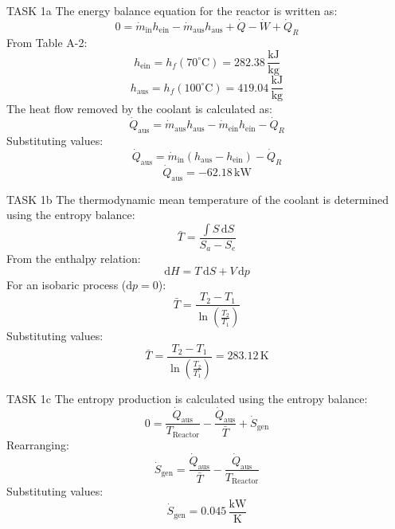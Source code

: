 TASK 1a  
The energy balance equation for the reactor is written as:  
\[
0 = \dot{m}_{\text{in}} h_{\text{ein}} - \dot{m}_{\text{aus}} h_{\text{aus}} + \dot{Q} - \dot{W} + \dot{Q}_R
\]  
From Table A-2:  
\[
h_{\text{ein}} = h_f(70^\circ\text{C}) = 282.38 \, \frac{\text{kJ}}{\text{kg}}
\]  
\[
h_{\text{aus}} = h_f(100^\circ\text{C}) = 419.04 \, \frac{\text{kJ}}{\text{kg}}
\]  
The heat flow removed by the coolant is calculated as:  
\[
\dot{Q}_{\text{aus}} = \dot{m}_{\text{aus}} h_{\text{aus}} - \dot{m}_{\text{ein}} h_{\text{ein}} - \dot{Q}_R
\]  
Substituting values:  
\[
\dot{Q}_{\text{aus}} = \dot{m}_{\text{in}} (h_{\text{aus}} - h_{\text{ein}}) - \dot{Q}_R
\]  
\[
\dot{Q}_{\text{aus}} = -62.18 \, \text{kW}
\]  

TASK 1b  
The thermodynamic mean temperature of the coolant is determined using the entropy balance:  
\[
\bar{T} = \frac{\int S \, \text{d}S}{S_a - S_e}
\]  
From the enthalpy relation:  
\[
\text{d}H = T \, \text{d}S + V \, \text{d}p
\]  
For an isobaric process (\( \text{d}p = 0 \)):  
\[
\bar{T} = \frac{T_2 - T_1}{\ln \left( \frac{T_2}{T_1} \right)}
\]  
Substituting values:  
\[
\bar{T} = \frac{T_2 - T_1}{\ln \left( \frac{T_2}{T_1} \right)} = 283.12 \, \text{K}
\]  

TASK 1c  
The entropy production is calculated using the entropy balance:  
\[
0 = \frac{\dot{Q}_{\text{aus}}}{T_{\text{Reactor}}} - \frac{\dot{Q}_{\text{aus}}}{\bar{T}} + \dot{S}_{\text{gen}}
\]  
Rearranging:  
\[
\dot{S}_{\text{gen}} = \frac{\dot{Q}_{\text{aus}}}{\bar{T}} - \frac{\dot{Q}_{\text{aus}}}{T_{\text{Reactor}}}
\]  
Substituting values:  
\[
\dot{S}_{\text{gen}} = 0.045 \, \frac{\text{kW}}{\text{K}}
\]
